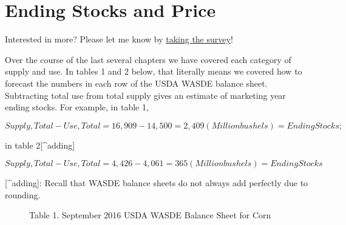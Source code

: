 \documentclass[
  letterpaper,
  DIV=11,
  numbers=noendperiod]{scrreprt}
\begin{document}

\hypertarget{ending-stocks-and-price}{%
\chapter{Ending Stocks and Price}\label{ending-stocks-and-price}}

{Interested in more? Please let me know by}
\href{https://forms.gle/Q3VByCQZHjfQSy9D7}{taking the survey}!

Over the course of the last several chapters we have covered each
category of supply and use. In tables 1 and 2 below, that literally
means we covered how to forecast the numbers in each row of the USDA
WASDE balance sheet. Subtracting total use from total supply gives an
estimate of marketing year ending stocks. For example, in table 1,

\[Supply, Total - Use, Total = 16,909 - 14,500 = 2,409 (Million bushels) = Ending Stocks;\]

in table 2{[}\^{}adding{]}

\[Supply, Total - Use, Total = 4,426 - 4,061 = 365 (Million bushels) = Ending Stocks\]

\begin{description}
\item[{[}\^{}adding{]}: Recall that WASDE balance sheets do not always
add perfectly due to rounding.]
Table 1. September 2016 USDA WASDE Balance Sheet for Corn
\end{description}
\end{document}
